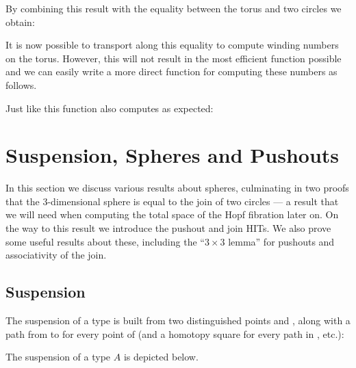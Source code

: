 By combining this result with the equality between the torus and two
circles we obtain:
%

It is now possible to transport along this equality to compute winding
numbers on the torus. However, this will not result in the most
efficient function possible and we can easily write a more direct
function for computing these numbers as follows.
%

Just like  this function also computes as expected:
%

\section{Suspension, Spheres and Pushouts}

In this section we discuss various results about spheres, culminating
in two proofs that the 3-dimensional sphere is equal to the join of
two circles --- a result that we will need when computing the total
space of the Hopf fibration later on. On the way to this result we
introduce the pushout and join HITs. We also prove some useful results
about these, including the ``$3 \times 3$ lemma'' for pushouts and
associativity of the join.

\subsection{Suspension}
\label{sec:susp}

The suspension of a type  is built from two distinguished
points  and , along with a path from 
to  for every point of  (and a homotopy square for
every path in , etc.):
%

The suspension of a type $A$ is depicted below.

